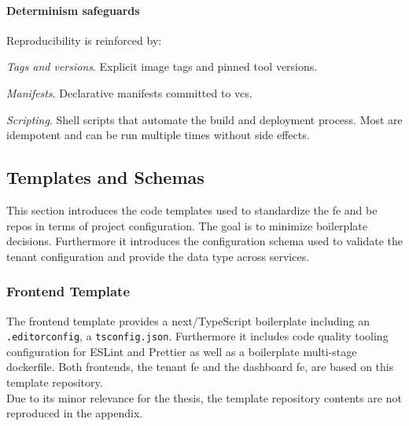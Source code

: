 \documentclass[11pt, a4paper, oneside, listof=totoc]{scrartcl}
\begin{document}
            \paragraph{Determinism safeguards}
                Reproducibility is reinforced by:
                \begin{enumerate}[label={[\arabic*]:},
                    ref=Challenge~\arabic*,
                    leftmargin=*,
                    itemsep=0.6\baselineskip]

                    \item\label{chal:pinned}
                        \textit{Tags and versions}.
                        Explicit image tags and pinned tool versions.
                        
                    \item\label{chal:manifests}
                        \textit{Manifests}.
                        Declarative manifests committed to \gls{vcs}.

                    \item\label{chal:scripting}
                        \textit{Scripting}.
                        Shell scripts that automate the build and deployment process.
                        Most are idempotent and can be run multiple times without side effects.

                \end{enumerate}

    \clearpage

        \subsection{Templates and Schemas}\label{subsec:templatesAndSchemas}
            This section introduces the code templates used to standardize the \gls{fe} and \gls{be}
            repos in terms of project configuration.
            The goal is to minimize boilerplate decisions.
            Furthermore it introduces the configuration schema used to validate the tenant
            configuration and provide the data type across services.

            \subsubsection{Frontend Template}\label{subsubsec:frontendTemplate}
                The frontend template provides a \gls{next}/TypeScript boilerplate including an
                \texttt{.editorconfig}, a \texttt{tsconfig.json}.
                Furthermore it includes code quality tooling configuration for ESLint and Prettier
                as well as a boilerplate multi-stage dockerfile.
                Both frontends, the tenant \gls{fe} and the dashboard \gls{fe}, are based on this
                template repository.\\
                Due to its minor relevance for the thesis, the template repository contents are not
                reproduced in the appendix.
\end{document}
